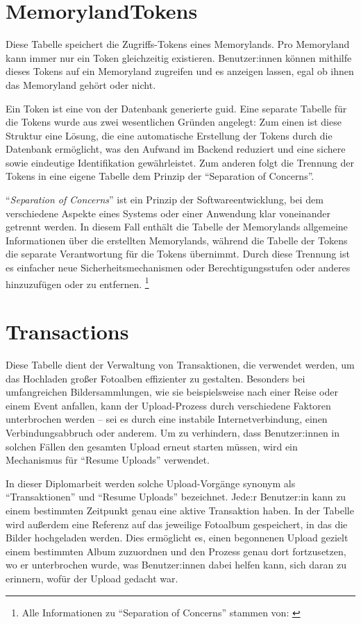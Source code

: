 \section{MemorylandTokens}

Diese Tabelle speichert die Zugriffs-Tokens eines Memorylands. Pro Memoryland kann immer nur 
ein Token gleichzeitig existieren. Benutzer:innen können mithilfe dieses Tokens auf ein 
Memoryland zugreifen und es anzeigen lassen, egal ob ihnen das Memoryland gehört oder nicht.

Ein Token ist eine von der Datenbank generierte \gls{guid}. Eine separate Tabelle für die 
Tokens wurde aus zwei wesentlichen Gründen angelegt: Zum einen ist diese Struktur eine Lösung,
die eine automatische Erstellung der Tokens durch die Datenbank ermöglicht, was den 
Aufwand im Backend reduziert und eine sichere sowie eindeutige Identifikation gewährleistet. 
Zum anderen folgt die Trennung der Tokens in eine eigene Tabelle dem Prinzip der 
``Separation of Concerns''.

``\emph{Separation of Concerns}'' ist ein Prinzip der Softwareentwicklung, bei dem 
verschiedene Aspekte eines Systems oder einer Anwendung klar voneinander getrennt werden. 
In diesem Fall enthält die Tabelle der Memorylands allgemeine Informationen über die 
erstellten Memorylands, während die Tabelle der Tokens die separate Verantwortung 
für die Tokens übernimmt. Durch diese Trennung ist es einfacher neue Sicherheitsmechanismen 
oder Berechtigungsstufen oder anderes hinzuzufügen oder zu entfernen.
\footnote{Alle Informationen zu ``Separation of Concerns'' stammen von: \cite{kulkarni2003separation}}

\section{Transactions}

Diese Tabelle dient der Verwaltung von Transaktionen, die verwendet werden, um das Hochladen 
großer Fotoalben effizienter zu gestalten. Besonders bei umfangreichen Bildersammlungen, 
wie sie beispielsweise nach einer Reise oder einem Event anfallen, kann der Upload-Prozess 
durch verschiedene Faktoren unterbrochen werden -- sei es durch eine instabile 
Internetverbindung, einen Verbindungsabbruch oder anderem. Um zu verhindern, dass 
Benutzer:innen in solchen Fällen den gesamten Upload erneut starten müssen, wird ein 
Mechanismus für ``Resume Uploads'' verwendet.

In dieser Diplomarbeit werden solche Upload-Vorgänge synonym als ``Transaktionen'' und 
``Resume Uploads'' bezeichnet. Jede:r Benutzer:in kann zu einem bestimmten Zeitpunkt 
genau eine aktive Transaktion haben. In der Tabelle wird außerdem eine Referenz auf 
das jeweilige Fotoalbum gespeichert, in das die Bilder hochgeladen werden. 
Dies ermöglicht es, einen begonnenen Upload gezielt einem bestimmten Album zuzuordnen 
und den Prozess genau dort fortzusetzen, wo er unterbrochen wurde, was Benutzer:innen
dabei helfen kann, sich daran zu erinnern, wofür der Upload gedacht war.

